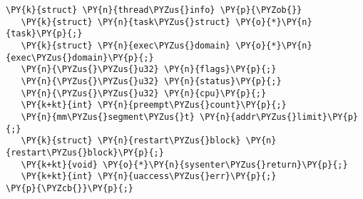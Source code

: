 \begin{Verbatim}[commandchars=\\\{\}]
\PY{k}{struct} \PY{n}{thread\PYZus{}info} \PY{p}{\PYZob{}}
   \PY{k}{struct} \PY{n}{task\PYZus{}struct} \PY{o}{*}\PY{n}{task}\PY{p}{;}
   \PY{k}{struct} \PY{n}{exec\PYZus{}domain} \PY{o}{*}\PY{n}{exec\PYZus{}domain}\PY{p}{;}
   \PY{n}{\PYZus{}\PYZus{}u32} \PY{n}{flags}\PY{p}{;}
   \PY{n}{\PYZus{}\PYZus{}u32} \PY{n}{status}\PY{p}{;}
   \PY{n}{\PYZus{}\PYZus{}u32} \PY{n}{cpu}\PY{p}{;}
   \PY{k+kt}{int} \PY{n}{preempt\PYZus{}count}\PY{p}{;}
   \PY{n}{mm\PYZus{}segment\PYZus{}t} \PY{n}{addr\PYZus{}limit}\PY{p}{;}
   \PY{k}{struct} \PY{n}{restart\PYZus{}block} \PY{n}{restart\PYZus{}block}\PY{p}{;}
   \PY{k+kt}{void} \PY{o}{*}\PY{n}{sysenter\PYZus{}return}\PY{p}{;}
   \PY{k+kt}{int} \PY{n}{uaccess\PYZus{}err}\PY{p}{;}
\PY{p}{\PYZcb{}}\PY{p}{;}
\end{Verbatim}
